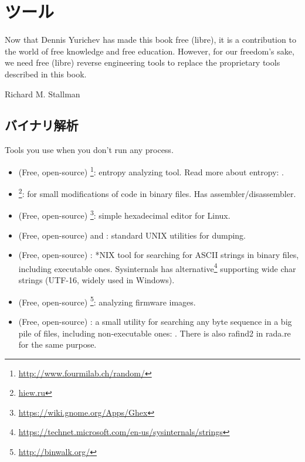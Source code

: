 \chapter{ツール}

\epigraph{Now that Dennis Yurichev has made this book free (libre), it is a
contribution to the world of free knowledge and free education.
However, for our freedom's sake, we need free (libre) reverse
engineering tools to replace the proprietary tools described in this book.}{Richard M. Stallman}

\section{バイナリ解析}

Tools you use when you don't run any process.


\begin{itemize}
\item
(Free, open-source) \footnote{\url{http://www.fourmilab.ch/random/}}: entropy analyzing tool.
Read more about entropy: .

\item
\label{Hiew}
\footnote{\href{http://go.yurichev.com/17035}{hiew.ru}}:
for small modifications of code in binary files.
Has assembler/disassembler.

\item (Free, open-source) \footnote{\url{https://wiki.gnome.org/Apps/Ghex}}: simple hexadecimal editor for Linux.

\item (Free, open-source)  and : standard UNIX utilities for dumping.

\item (Free, open-source) : *NIX tool for searching for ASCII strings in binary files, including executable ones.
Sysinternals has alternative\footnote{\url{https://technet.microsoft.com/en-us/sysinternals/strings}}
supporting wide char strings (UTF-16, widely used in Windows).

\item (Free, open-source) \footnote{\url{http://binwalk.org/}}: analyzing firmware images.

\item
{}
(Free, open-source) :
a small utility for searching any byte sequence in a big pile of files,
including non-executable ones: \BGREPURL.
There is also rafind2 in rada.re for the same purpose.
\end{itemize}

